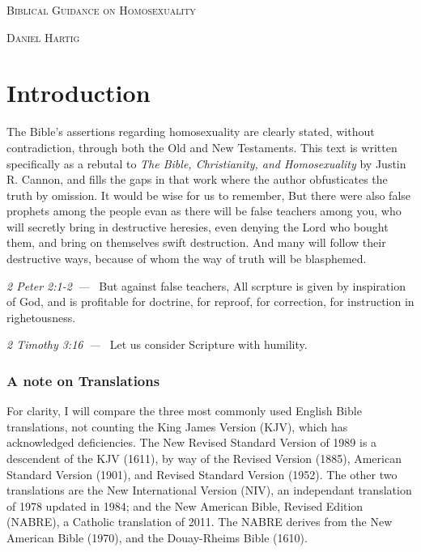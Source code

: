 \documentclass[10pt]{article}
\let\oldquote\quote
\let\endoldquote\endquote
\renewenvironment{quote}[2][]
  {\if\relax\detokenize{#1}\relax
     \def\quoteauthor{#2}%
   \else
     \def\quoteauthor{#2~---~#1}%
   \fi
   \oldquote}
  {\par\nobreak\smallskip\hfill\textit{\quoteauthor}%
   \endoldquote\addvspace{\bigskipamount}}
\begin{document}
\begin{titlepage}\centering
{\scshape\huge Biblical Guidance on Homosexuality \par}
\vfill
{\scshape\large Daniel Hartig \par}
\vfill
\end{titlepage}
\singlespace
\section*{Introduction}

The Bible's assertions regarding homosexuality are clearly stated, without contradiction, through both the Old and New Testaments. This text is written specifically as a rebutal to \textit{The Bible, Christianity, and Homosexuality} by Justin R. Cannon, and fills the gaps in that work where the author obfusticates the truth by omission. It would be wise for us to remember,
\begin{quote}{2 Peter 2:1-2}
But there were also false prophets among the people evan as there will be false teachers among you, who will secretly bring in destructive heresies, even denying the Lord who bought them, and bring on themselves swift destruction. And many will follow their destructive ways, because of whom the way of truth will be blasphemed. 
\end{quote} 
But against false teachers, 
\begin{quote}{2 Timothy 3:16}
All scrpture is given by inspiration of God, and is profitable for doctrine, for reproof, for correction, for instruction in righetousness.
\end{quote} 
Let us consider Scripture with humility.

\subsubsection*{A note on Translations}

For clarity, I will compare the three most commonly used English Bible translations, not counting the King James Version (KJV), which has acknowledged deficiencies. The New Revised Standard Version of 1989 is a descendent of the KJV (1611), by way of the Revised Version (1885), American Standard Version (1901), and Revised Standard Version (1952). The other two translations are the New International Version (NIV), an independant translation of 1978 updated in 1984; and the New American Bible, Revised Edition (NABRE), a Catholic translation of 2011. The NABRE derives from the New American Bible (1970), and the Douay-Rheims Bible (1610). 
\end{document}
